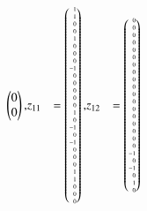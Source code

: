 \begin{beispiel}
{\begin{align*}
\begin{pmatrix*}[r]
 0\\
 0
\end{pmatrix*},
&z_{11} %
&=
\tiny
\begin{pmatrix*}[r]
 1\\
 1\\
 0\\
 0\\
 1\\ %
 0\\
 0\\
 0\\
-1\\
 0\\ %
 0\\
 0\\
 0\\
 0\\
 1\\ %
 0\\
-1\\
 0\\
-1\\
 0\\ %
 0\\
 0\\
 1\\
 1\\
 0\\ %
 0\\
 0
\end{pmatrix*},
&z_{12} %
&=
\tiny
\begin{pmatrix*}[r]
 0\\
 0\\
 0\\
 0\\
 0\\
 0\\
 0\\
 0\\
 0\\
 0\\ %
 0\\
 0\\
 0\\
 0\\
 0\\ %
 0\\
 0\\
 0\\
-1\\
 0\\ %
-1\\
 0\\
 1\\
 0\\

\end{pmatrix*}
\end{align*}}
\end{beispiel}
